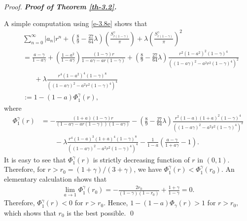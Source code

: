 \documentclass[a4paper,12pt]{amsart}
\theoremstyle{plain}
\theoremstyle{definition}
\newenvironment{pf}[1][]{%
 \vskip 3mm
 \noindent
 \ifthenelse{\equal{#1}{}}%
  {{\slshape Proof. }}%
  {{\slshape #1.} }%
 }%
{\qed\bigskip}
\begin{document}
\begin{pf}[\bf Proof of Theorem \ref{th-3.2}]
\begin{equation*}
\end{equation*}
A simple computation using \eqref{e-3.8e} shows that
\begin{align*} &
	\sum_{n=0}^{\infty}{|a_n|}r^n+\left(\frac{8}{9}-\frac{27}{64}\lambda\right)\left(\frac{S^{\gamma}_{r(1-\gamma)}}{\pi}\right)+\lambda\left(\frac{S^{\gamma}_{r(1-\gamma)}}{\pi}\right)^2\\&=\frac{a-\gamma}{1-a\gamma}+\left(\frac{1-a^2}{1-a\gamma}\right)\frac{(1-\gamma)r}{1-a\gamma-ar(1-\gamma)}+\left(\frac{8}{9}-\frac{27}{64}\lambda\right)\frac{r^2(1-a^2)^2(1-\gamma)^4}{((1-a\gamma)^2-a^2r^2(1-\gamma)^4)^2}\\& \;\;\;\;\;\;+\lambda\frac{r^4(1-a^2)^4(1-\gamma)^8}{((1-a\gamma)^2-a^2r^2(1-\gamma)^4)^4} \\& :=1-(1-a)\Phi^{\gamma}_1(r),
\end{align*}
where 
\begin{align*} 
	\Phi^{\gamma}_1(r)&=-\frac{(1+a)(1-\gamma)r}{(1-a\gamma-ar(1-\gamma))(1-a\gamma)}-\left(\frac{8}{9}-\frac{27}{64}\lambda\right)\frac{r^2(1-a)(1+a)^2(1-\gamma)^4}{((1-a\gamma)^2-a^2r^2(1-\gamma)^4)^2}\\&\quad\quad -\lambda\frac{r^4(1-a)^3(1+a)^4(1-\gamma)^8}{((1-a\gamma)^2-a^2r^2(1-\gamma)^4)^4}-\frac{1}{1-a}\left(\frac{a-\gamma}{1+a\gamma}-1\right).
\end{align*}
It is easy to see that $ \Phi^{\gamma}_1(r) $ is strictly decreasing function of $ r$ in $(0,1) $. Therefore,  for $ r>r_0=(1+\gamma)/(3+\gamma) $, we have $ \Phi^{\gamma}_1(r)<\Phi^{\gamma}_1(r_0) $. An elementary calculation shows that 
\begin{align*}
	\lim_{a\rightarrow 1}\Phi^{\gamma}_1(r_0)=-\frac{2r_0}{(1-\gamma)(1-r_0)}+\frac{1+\gamma}{1-\gamma}=0.
\end{align*}
Therefore, $ \Phi^{\gamma}_1(r)< 0 $ for $ r>r_0 $. Hence, $ 1-(1-a)\Phi_{\gamma}(r)>1 $ for $ r>r_0, $ which shows that $ r_0 $ is the best possible. 
\end{pf}
\end{document}
